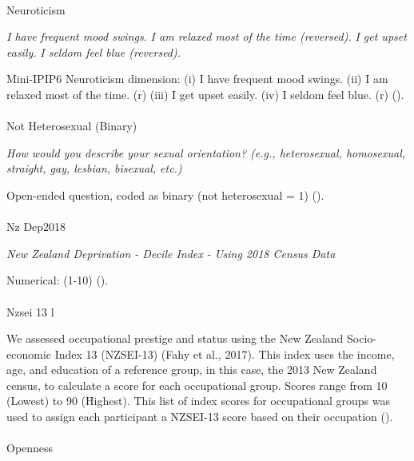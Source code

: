 \documentclass[
  single column]{article}
\makeatletter
\let\oldparagraph\paragraph
\renewcommand{\paragraph}{
    \@ifstar
      \xxxParagraphStar
      \xxxParagraphNoStar
  }
\newcommand{\xxxParagraphStar}[1]{\oldparagraph*{#1}\mbox{}}
\newcommand{\xxxParagraphNoStar}[1]{\oldparagraph{#1}\mbox{}}
\makeatother
\begin{document}
\paragraph{Neuroticism}\label{neuroticism}

\emph{I have frequent mood swings.} \emph{I am relaxed most of the time
(reversed).} \emph{I get upset easily.} \emph{I seldom feel blue
(reversed).}

Mini-IPIP6 Neuroticism dimension: (i) I have frequent mood swings. (ii)
I am relaxed most of the time. (r) (iii) I get upset easily. (iv) I
seldom feel blue. (r) ().

\paragraph{Not Heterosexual (Binary)}\label{not-heterosexual-binary}

\emph{How would you describe your sexual orientation? (e.g.,
heterosexual, homosexual, straight, gay, lesbian, bisexual, etc.)}

Open-ended question, coded as binary (not heterosexual = 1)
().

\paragraph{Nz Dep2018}\label{nz-dep2018}

\emph{New Zealand Deprivation - Decile Index - Using 2018 Census Data}

Numerical: (1-10) ().

\paragraph{Nzsei 13 l}\label{nzsei-13-l}

We assessed occupational prestige and status using the New Zealand
Socio-economic Index 13 (NZSEI-13) (Fahy et al., 2017). This index uses
the income, age, and education of a reference group, in this case, the
2013 New Zealand census, to calculate a score for each occupational
group. Scores range from 10 (Lowest) to 90 (Highest). This list of index
scores for occupational groups was used to assign each participant a
NZSEI-13 score based on their occupation ().

\paragraph{Openness}\label{openness}
\end{document}
